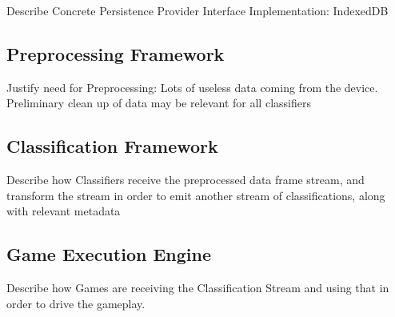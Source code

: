 Describe Concrete Persistence Provider Interface Implementation: IndexedDB
\subsection{Preprocessing Framework}
Justify need for Preprocessing: Lots of useless data coming from the device. Preliminary
clean up of data may be relevant for all classifiers
\subsection{Classification Framework}
Describe how Classifiers receive the preprocessed data frame stream, and transform the stream in order to emit another stream of classifications, along with relevant metadata
\subsection{Game Execution Engine}
Describe how Games are receiving the Classification Stream and using that in order to drive the gameplay.

